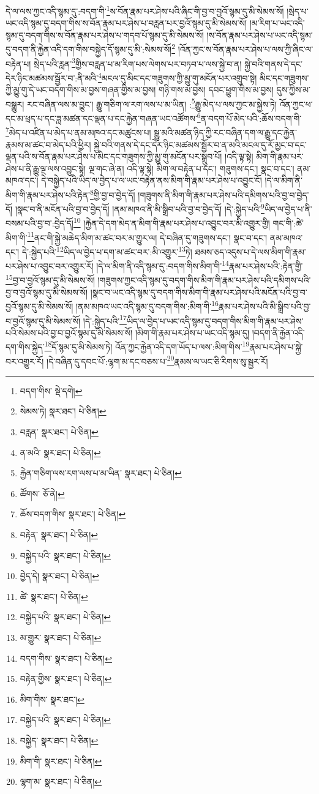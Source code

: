 དེ་ལ་ལས་ཀྱང་འདི་སྙམ་དུ་:བདག་གི་\footnote{བདག་གིས་  སྡེ་དགེ། }ས་བོན་རྣམ་པར་ཤེས་པའི་ཞིང་གི་བྱ་བ་བྱའོ་སྙམ་དུ་མི་སེམས་སོ། །སྲེད་པ་ཡང་འདི་སྙམ་དུ་བདག་གིས་ས་བོན་རྣམ་པར་ཤེས་པ་བརླན་པར་བྱའོ་སྙམ་དུ་མི་སེམས་སོ། །མ་རིག་པ་ཡང་འདི་སྙམ་དུ་བདག་གིས་ས་བོན་རྣམ་པར་ཤེས་པ་གདབ་པོ་སྙམ་དུ་མི་སེམས་སོ། །ས་བོན་རྣམ་པར་ཤེས་པ་ཡང་འདི་སྙམ་དུ་བདག་ནི་རྐྱེན་འདི་དག་གིས་བསྐྱེད་དོ་སྙམ་དུ་མི་:སེམས་སོ།\footnote{སེམས་ཏེ།  སྣར་ཐང་།  པེ་ཅིན། } །འོན་ཀྱང་ས་བོན་རྣམ་པར་ཤེས་པ་ལས་ཀྱི་ཞིང་ལ་བརྟེན་པ། སྲེད་པའི་རླན་\footnote{བརླན་  སྣར་ཐང་།  པེ་ཅིན། }གྱིས་བརླན་པ་མ་རིག་པས་ལེགས་པར་བཏབ་པ་ལས་སྐྱེ་བ་ན། སྐྱེ་བའི་གནས་དེ་དང་དེར་ཉིང་མཚམས་སྦྱོར་བ་:ནི་མའི་\footnote{ན་མའི་  སྣར་ཐང་།  པེ་ཅིན། }མངལ་དུ་མིང་དང་གཟུགས་ཀྱི་མྱུ་གུ་མངོན་པར་འགྲུབ་སྟེ། མིང་དང་གཟུགས་ཀྱི་མྱུ་གུ་དེ་ཡང་བདག་གིས་མ་བྱས་གཞན་གྱིས་མ་བྱས། གཉི་གས་མ་བྱས། དབང་ཕྱུག་གིས་མ་བྱས། དུས་ཀྱིས་མ་བསྒྱུར། རང་བཞིན་ལས་མ་བྱུང་། རྒྱུ་གཅིག་ལ་རག་ལས་པ་མ་ཡིན། :\footnote{རྐྱེན་གཅིག་ལས་རག་ལས་པ་མ་ཡིན་  སྣར་ཐང་།  པེ་ཅིན། }རྒྱུ་མེད་པ་ལས་ཀྱང་མ་སྐྱེས་ཏེ། འོན་ཀྱང་ཕ་དང་མ་ཕྲད་པ་དང་ཟླ་མཚན་དང་ལྡན་པ་དང་རྐྱེན་གཞན་ཡང་འཚོགས་\footnote{ཚོགས་  ཅོ་ནེ། }ན་བདག་པོ་མེད་པའི་:ཆོས་བདག་གི་\footnote{ཆོས་བདག་གིས་  སྣར་ཐང་།  པེ་ཅིན། }མེད་པ་འཛིན་པ་མེད་པ་ནམ་མཁའ་དང་མཚུངས་པ། སྒྱུ་མའི་མཚན་ཉིད་ཀྱི་རང་བཞིན་དག་ལ་རྒྱུ་དང་རྐྱེན་རྣམས་མ་ཚང་བ་མེད་པའི་ཕྱིར། སྐྱེ་བའི་གནས་དེ་དང་དེར་ཉིང་མཚམས་སྦྱོར་བ་ན་མའི་མངལ་དུ་རོ་མྱང་བ་དང་ལྡན་པའི་ས་བོན་རྣམ་པར་ཤེས་པ་མིང་དང་གཟུགས་ཀྱི་མྱུ་གུ་མངོན་པར་སྒྲུབ་པོ། །འདི་ལྟ་སྟེ། མིག་གི་རྣམ་པར་ཤེས་པ་ནི་རྒྱུ་ལྔ་ལས་འབྱུང་སྟེ། ལྔ་གང་ཞེ་ན། འདི་ལྟ་སྟེ། མིག་ལ་བརྟེན་པ་དང་། གཟུགས་དང་། སྣང་བ་དང་། ནམ་མཁའ་དང་། དེ་བསྐྱེད་པའི་ཡིད་ལ་བྱེད་པ་ལ་ཡང་བརྟེན་ནས་མིག་གི་རྣམ་པར་ཤེས་པ་འབྱུང་ངོ། །དེ་ལ་མིག་ནི་མིག་གི་རྣམ་པར་ཤེས་པའི་རྟེན་\footnote{བརྟེན་  སྣར་ཐང་།  པེ་ཅིན། }གྱི་བྱ་བ་བྱེད་དོ། །གཟུགས་ནི་མིག་གི་རྣམ་པར་ཤེས་པའི་དམིགས་པའི་བྱ་བ་བྱེད་དོ། །སྣང་བ་ནི་མངོན་པའི་བྱ་བ་བྱེད་དོ། །ནམ་མཁའ་ནི་མི་སྒྲིབ་པའི་བྱ་བ་བྱེད་དོ། །དེ་:སྐྱེད་པའི་\footnote{བསྐྱེད་པའི་  སྣར་ཐང་།  པེ་ཅིན། }ཡིད་ལ་བྱེད་པ་ནི་བསམ་པའི་བྱ་བ་:བྱེད་དོ།\footnote{བྱེད་དེ།  སྣར་ཐང་།  པེ་ཅིན། } །རྐྱེན་དེ་དག་མེད་ན་མིག་གི་རྣམ་པར་ཤེས་པ་འབྱུང་བར་མི་འགྱུར་གྱི། གང་གི་:ཚེ་མིག་གི་\footnote{ཚེ་  སྣར་ཐང་།  པེ་ཅིན། }ནང་གི་སྐྱེ་མཆེད་མིག་མ་ཚང་བར་མ་གྱུར་ལ། དེ་བཞིན་དུ་གཟུགས་དང་། སྣང་བ་དང་། ནམ་མཁའ་དང་། དེ་:སྐྱེད་པའི་\footnote{བསྐྱེད་པའི་  སྣར་ཐང་།  པེ་ཅིན། }ཡིད་ལ་བྱེད་པ་དག་མ་ཚང་བར་:མི་འགྱུར་\footnote{མ་གྱུར་  སྣར་ཐང་།  པེ་ཅིན། }ཏེ། ཐམས་ཅད་འདུས་པ་དེ་ལས་མིག་གི་རྣམ་པར་ཤེས་པ་འབྱུང་བར་འགྱུར་རོ། །དེ་ལ་མིག་ནི་འདི་སྙམ་དུ་:བདག་གིས་མིག་གི་\footnote{བདག་གིས་  སྣར་ཐང་།  པེ་ཅིན། }རྣམ་པར་ཤེས་པའི་:རྟེན་གྱི་\footnote{བརྟེན་གྱིས་  སྣར་ཐང་།  པེ་ཅིན། }བྱ་བ་བྱའོ་སྙམ་དུ་མི་སེམས་སོ། །གཟུགས་ཀྱང་འདི་སྙམ་དུ་བདག་གིས་མིག་གི་རྣམ་པར་ཤེས་པའི་དམིགས་པའི་བྱ་བ་བྱའོ་སྙམ་དུ་མི་སེམས་སོ། །སྣང་བ་ཡང་འདི་སྙམ་དུ་བདག་གིས་མིག་གི་རྣམ་པར་ཤེས་པའི་མངོན་པའི་བྱ་བ་བྱའོ་སྙམ་དུ་མི་སེམས་སོ། །ནམ་མཁའ་ཡང་འདི་སྙམ་དུ་བདག་གིས་:མིག་གི་\footnote{མིག་གིས་  སྣར་ཐང་། }རྣམ་པར་ཤེས་པའི་མི་སྒྲིབ་པའི་བྱ་བ་བྱའོ་སྙམ་དུ་མི་སེམས་སོ། །དེ་:སྐྱེད་པའི་\footnote{བསྐྱེད་པའི་  སྣར་ཐང་།  པེ་ཅིན། }ཡིད་ལ་བྱེད་པ་ཡང་འདི་སྙམ་དུ་བདག་གིས་མིག་གི་རྣམ་པར་ཤེས་པའི་སེམས་པའི་བྱ་བ་བྱའོ་སྙམ་དུ་མི་སེམས་སོ། །མིག་གི་རྣམ་པར་ཤེས་པ་ཡང་འདི་སྙམ་དུ། །བདག་ནི་རྐྱེན་འདི་དག་གིས་སྐྱེད་\footnote{བསྐྱེད་  སྣར་ཐང་།  པེ་ཅིན། }དོ་སྙམ་དུ་མི་སེམས་ཏེ། འོན་ཀྱང་རྐྱེན་འདི་དག་ཡོད་པ་ལས་:མིག་གིས་\footnote{མིག་གི་  སྣར་ཐང་།  པེ་ཅིན། }རྣམ་པར་ཤེས་པ་སྐྱེ་བར་འགྱུར་རོ། །དེ་བཞིན་དུ་དབང་པོ་:ལྷག་མ་དང་བཅས་པ་\footnote{ལྷག་མ་  སྣར་ཐང་།  པེ་ཅིན། }རྣམས་ལ་ཡང་ཅི་རིགས་སུ་སྦྱར་རོ། 